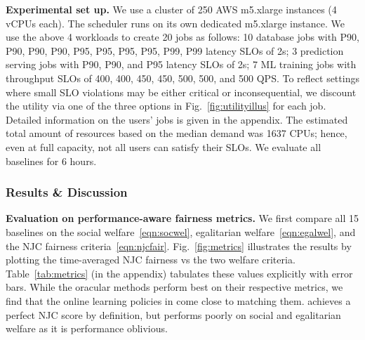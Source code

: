 \textbf{Experimental set up.}
We use a cluster of  250 AWS m5.xlarge instances (4 vCPUs each).
The \cilantro{} scheduler runs on its own dedicated m5.xlarge instance.
We use the above 4 workloads to create 20 jobs as follows:
10 database jobs with P90, P90, P90, P90, P95, P95, P95, P95, P99, P99 latency SLOs of 2s;
3 prediction serving jobs  with P90, P90, and P95 latency SLOs of 2s;
7 ML training jobs  with throughput SLOs of 400, 400, 450, 450, 500, 500, and
500 QPS.
To reflect settings where small SLO violations may be either critical or inconsequential,
we discount the utility via one of the three options in Fig.~\ref{fig:utilityillus} for each job.
Detailed information on the users' jobs is given in the appendix.
The estimated total amount of resources based on the median demand was 1637 CPUs;
hence, even at full capacity, not all users can satisfy their SLOs.
We evaluate all baselines for 6 hours.





\subsubsection{Results \& Discussion}
\label{sec:baselines}

\insertFigMetrics

\insertFigTimeseriesUtilities
\textbf{Evaluation on performance-aware fairness metrics.}
We first compare all 15 baselines on the social
welfare~\eqref{eqn:socwel}, egalitarian welfare~\eqref{eqn:egalwel}, and the NJC fairness
criteria~\eqref{eqn:njcfair}.
% 
Fig.~\ref{fig:metrics} illustrates the results by
plotting the time-averaged NJC fairness vs the two welfare criteria.
Table~\ref{tab:metrics} (in the appendix) tabulates these values explicitly with error bars.
While the oracular methods perform best on their respective metrics, we find that the online
learning policies in \cilantros come close to matching them.
\equalshare{} achieves a perfect NJC score by definition, but performs poorly on social and
egalitarian welfare as it is performance oblivious.

